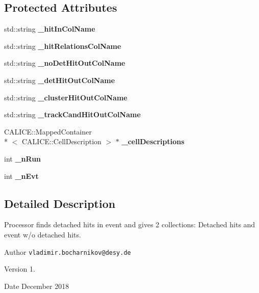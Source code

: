 \subsection*{Protected Attributes}
\begin{DoxyCompactItemize}
\item 
std\-::string {\bfseries \-\_\-hit\-In\-Col\-Name}\label{classCALICE_1_1HitClassificationProcessor_a9728f3e9e72130b73d912cf0c50f67fd}

\item 
std\-::string {\bfseries \-\_\-hit\-Relations\-Col\-Name}\label{classCALICE_1_1HitClassificationProcessor_ae8898cde95f25d829d49fbfc25f158d3}

\item 
std\-::string {\bfseries \-\_\-no\-Det\-Hit\-Out\-Col\-Name}\label{classCALICE_1_1HitClassificationProcessor_a5d892bf0f032d14513034fb5470da211}

\item 
std\-::string {\bfseries \-\_\-det\-Hit\-Out\-Col\-Name}\label{classCALICE_1_1HitClassificationProcessor_ad63846abd41321ab0e718fb7bccb35ef}

\item 
std\-::string {\bfseries \-\_\-cluster\-Hit\-Out\-Col\-Name}\label{classCALICE_1_1HitClassificationProcessor_a11a0cfe83fb04d23b2d4434f30fcff4f}

\item 
std\-::string {\bfseries \-\_\-track\-Cand\-Hit\-Out\-Col\-Name}\label{classCALICE_1_1HitClassificationProcessor_adbf54b9e59ea5311843ede08b66f76b3}

\item 
C\-A\-L\-I\-C\-E\-::\-Mapped\-Container\\*
$<$ C\-A\-L\-I\-C\-E\-::\-Cell\-Description $>$ $\ast$ {\bfseries \-\_\-cell\-Descriptions}\label{classCALICE_1_1HitClassificationProcessor_a8714c1e9a48c7adf16095118edbd7550}

\item 
int {\bf \-\_\-n\-Run}
\item 
int {\bf \-\_\-n\-Evt}
\end{DoxyCompactItemize}


\subsection{Detailed Description}
Processor finds detached hits in event and gives 2 collections\-: Detached hits and event w/o detached hits. 

\begin{DoxyAuthor}{Author}
{\tt vladimir.\-bocharnikov@desy.\-de} 
\end{DoxyAuthor}
\begin{DoxyVersion}{Version}
1. 
\end{DoxyVersion}
\begin{DoxyDate}{Date}
December 2018 
\end{DoxyDate}


